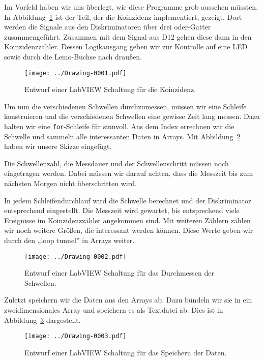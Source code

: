 \documentclass[11pt, ngerman, fleqn, DIV=15, headinclude, BCOR=2cm]{scrreprt}
\begin{document}
Im Vorfeld haben wir uns überlegt, wie diese Programme grob aussehen müssten.
In Abbildung~\ref{fig:entwurf-1} ist der Teil, der die Koinzidenz
implementiert, gezeigt. Dort werden die Signale aus den Diskriminatoren über
drei oder-Gatter zusammengeführt. Zusammen mit dem Signal aus D12 gehen diese
dann in den Koinzidenzzähler. Dessen Logikausgang geben wir zur Kontrolle auf
eine LED sowie durch die Lemo-Buchse nach draußen.

\begin{figure}[htbp]
    \centering
    \texttt{[image: ../Drawing-0001.pdf]}
    \caption{%
        Entwurf einer LabVIEW Schaltung für die Koinzidenz.
    }
    \label{fig:entwurf-1}
\end{figure}

Um nun die verschiedenen Schwellen durchzumessen, müssen wir eine Schleife
konstruieren und die verschiedenen Schwellen eine gewisse Zeit lang messen.
Dazu halten wir eine \texttt{for}-Schleife für sinnvoll. Aus dem Index
errechnen wir die Schwelle und sammeln alle interessanten Daten in Arrays. Mit
Abbildung~\ref{fig:entwurf-2} haben wir unsere Skizze eingefügt.

Die Schwellenzahl, die Messdauer und der Schwellenschritt müssen noch
eingetragen werden. Dabei müssen wir darauf achten, dass die Messzeit bis zum
nächsten Morgen nicht überschritten wird.

In jedem Schleifendurchlauf wird die Schwelle berechnet und der Diskriminator
entsprechend eingestellt. Die Messzeit wird gewartet, bis entsprechend viele
Ereignisse im Koinzidenzzähler angekommen sind. Mit weiteren Zählern zählen wir
noch weitere Größen, die interessant werden können. Diese Werte geben wir durch
den „loop tunnel” in Arrays weiter.

\begin{figure}[htbp]
    \centering
    \texttt{[image: ../Drawing-0002.pdf]}
    \caption{%
        Entwurf einer LabVIEW Schaltung für das Durchmessen der Schwellen.
    }
    \label{fig:entwurf-2}
\end{figure}

Zuletzt speichern wir die Daten aus den Arrays ab. Dazu bündeln wir sie in ein
zweidimensionales Array und speichern es als Textdatei ab. Dies ist in
Abbildung~\ref{fig:entwurf-3} dargestellt.

\begin{figure}[htbp]
    \centering
    \texttt{[image: ../Drawing-0003.pdf]}
    \caption{%
        Entwurf einer LabVIEW Schaltung für das Speichern der Daten.
    }
    \label{fig:entwurf-3}
\end{figure}
\end{document}
